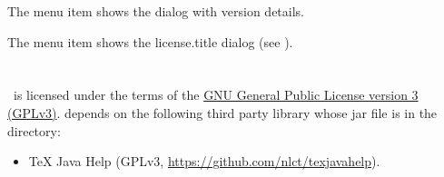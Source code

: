 
The  menu item shows the
dialog with version details.


The  menu item shows the
\InlineMsgDef
 {license.title}
dialog (see ).




\chapter{}
\label{sec:licence}

%
\JDRView\ is licensed under the terms of the 
\href{https://www.gnu.org/licenses/gpl-3.0.html}{GNU General
Public License version 3 (GPLv3)}.
 depends on the following third party library whose jar
file is in the  directory:
\begin{itemize}
   \item TeX Java Help 
   (GPLv3, \url{https://github.com/nlct/texjavahelp}).
\end{itemize}



\printmain
\printindex 

 

